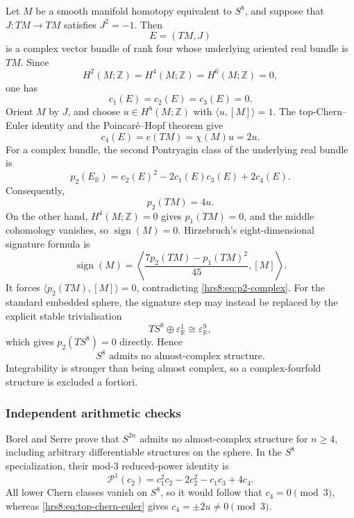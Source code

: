 Let $M$ be a smooth manifold homotopy equivalent to $S^8$, and suppose that
$J\colon TM\to TM$ satisfies $J^2=-1$.  Then
\[
 E=(TM,J)
\]
is a complex vector bundle of rank four whose underlying oriented real bundle
is $TM$.  Since
\[
 H^2(M;\mathbb Z)=H^4(M;\mathbb Z)=H^6(M;\mathbb Z)=0,
\]
one has
\[
 c_1(E)=c_2(E)=c_3(E)=0.
\]
Orient $M$ by $J$, and choose $u\in H^8(M;\mathbb Z)$ with
$\langle u,[M]\rangle=1$.  The top-Chern--Euler identity and the
Poincar\'e--Hopf theorem give
\begin{equation}
 c_4(E)=e(TM)=\chi(M)u=2u.
 \label{hrs8:eq:top-chern-euler}
\end{equation}
For a complex bundle, the second Pontryagin class of the underlying real
bundle is
\[
 p_2(E_{\mathbb R})
 =c_2(E)^2-2c_1(E)c_3(E)+2c_4(E).
\]
Consequently,
\begin{equation}
 p_2(TM)=4u.
 \label{hrs8:eq:p2-complex}
\end{equation}
On the other hand, $H^4(M;\mathbb Z)=0$ gives $p_1(TM)=0$, and the middle
cohomology vanishes, so $\operatorname{sign}(M)=0$.  Hirzebruch's
eight-dimensional signature formula is
\[
 \operatorname{sign}(M)
 =\left\langle\frac{7p_2(TM)-p_1(TM)^2}{45},[M]\right\rangle.
\]
It forces $\langle p_2(TM),[M]\rangle=0$, contradicting
\eqref{hrs8:eq:p2-complex}.  For the standard embedded sphere, the signature
step may instead be replaced by the explicit stable trivialisation
\[
 TS^8\oplus\varepsilon^1_{\mathbb R}\cong\varepsilon^9_{\mathbb R},
\]
which gives $p_2(TS^8)=0$ directly.  Hence
\begin{equation}
 \boxed{S^8\text{ admits no almost-complex structure}.}
 \label{hrs8:eq:no-almost-complex}
\end{equation}
Integrability is stronger than being almost complex, so a complex-fourfold
structure is excluded a fortiori.

\subsubsection{Independent arithmetic checks}
\label{hrs8:subsubsec:arithmetic-checks}

Borel and Serre prove that $S^{2n}$ admits no almost-complex structure for
$n\geq4$, including arbitrary differentiable structures on the sphere.  In
the $S^8$ specialization, their mod-$3$ reduced-power identity is
\[
 \mathcal P^1(c_2)
 =c_1^2c_2-2c_2^2-c_1c_3+4c_4.
\]
All lower Chern classes vanish on $S^8$, so it would follow that
$c_4=0\pmod 3$, whereas \eqref{hrs8:eq:top-chern-euler} gives
$c_4=\pm2u\neq0\pmod3$.

